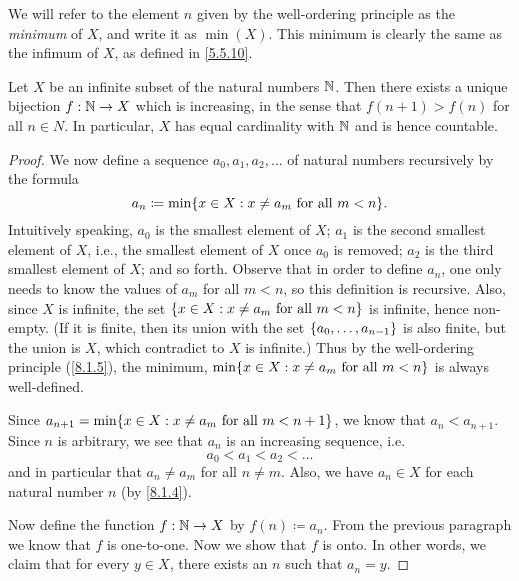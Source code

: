 \begin{note}
  We will refer to the element \(n\) given by the well-ordering principle as the \emph{minimum} of \(X\), and write it as \(\min(X)\).
  This minimum is clearly the same as the infimum of \(X\), as defined in \cref{5.5.10}.
\end{note}

\begin{prop}\label{8.1.5}
  Let \(X\) be an infinite subset of the natural numbers \(\mathbb{N}\).
  Then there exists a unique bijection \(f : \mathbb{N} \to X\) which is increasing, in the sense that \(f(n + 1) > f(n)\) for all \(n \in N\).
  In particular, \(X\) has equal cardinality with \(\mathbb{N}\) and is hence countable.
\end{prop}

\begin{proof}
  We now define a sequence \(a_0, a_1, a_2, \dots\) of natural numbers recursively by the formula
  \[
    a_n \coloneqq \min\set{x \in X : x \neq a_m \text{ for all } m < n}.
  \]
  Intuitively speaking, \(a_0\) is the smallest element of \(X\);
  \(a_1\) is the second smallest element of \(X\), i.e., the smallest element of \(X\) once \(a_0\) is removed;
  \(a_2\) is the third smallest element of \(X\);
  and so forth.
  Observe that in order to define \(a_n\), one only needs to know the values of \(a_m\) for all \(m < n\), so this definition is recursive.
  Also, since \(X\) is infinite, the set \(\left\lbrace x \in X : x \neq a_m \text{ for all } m < n\right\rbrace\) is infinite, hence non-empty.
  (If it is finite, then its union with the set \(\left\lbrace a_0, \dots, a_{n - 1}\right\rbrace\) is also finite, but the union is \(X\), which contradict to \(X\) is infinite.)
  Thus by the well-ordering principle (\cref{8.1.5}), the minimum, \(\min\set{x \in X : x \neq a_m \text{ for all } m < n}\) is always well-defined.

  Since \(a_{n + 1} = \min\set{x \in X : x \neq a_m \text{ for all } m < n + 1}\), we know that \(a_n < a_{n + 1}\).
  Since \(n\) is arbitrary, we see that \(a_n\) is an increasing sequence, i.e.
  \[
    a_0 < a_1 < a_2 < \dots
  \]
  and in particular that \(a_n \neq a_m\) for all \(n \neq m\).
  Also, we have \(a_n \in X\) for each natural number \(n\) (by \cref{8.1.4}).

  Now define the function \(f : \mathbb{N} \to X\) by \(f(n) \coloneqq a_n\).
  From the previous paragraph we know that \(f\) is one-to-one.
  Now we show that \(f\) is onto.
  In other words, we claim that for every \(y \in X\), there exists an \(n\) such that \(a_n = y\).


\end{proof}
